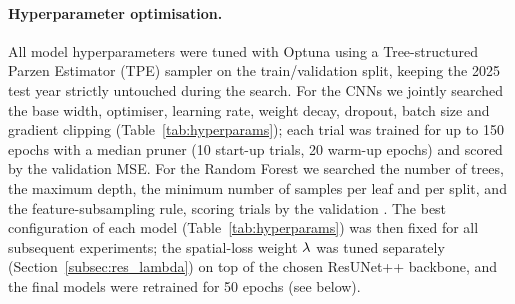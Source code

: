 \paragraph{Hyperparameter optimisation.}
All model hyperparameters were tuned with Optuna \citep{akiba2019} using a
Tree-structured Parzen Estimator (TPE) sampler on the train/validation split,
keeping the 2025 test year strictly untouched during the search. For the CNNs we
jointly searched the base width, optimiser, learning rate, weight decay,
dropout, batch size and gradient clipping (Table~\ref{tab:hyperparams}); each
trial was trained for up to 150 epochs with a median pruner (10 start-up trials,
20 warm-up epochs) and scored by the validation MSE. For the Random Forest we
searched the number of trees, the maximum depth, the minimum number of samples
per leaf and per split, and the feature-subsampling rule, scoring trials by the
validation \Rsq{}. The best configuration of each model (Table~\ref{tab:hyperparams})
was then fixed for all subsequent experiments; the spatial-loss weight $\lambda$
was tuned separately (Section~\ref{subsec:res_lambda}) on top of the chosen
ResUNet++ backbone, and the final models were retrained for 50 epochs (see
below).

